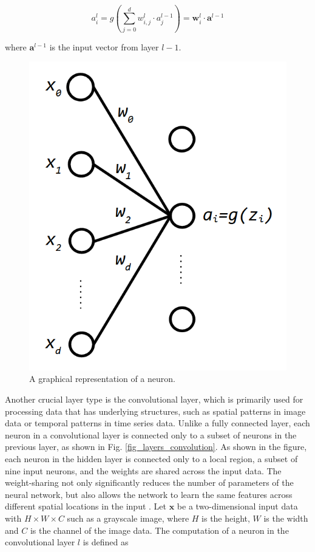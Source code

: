 \documentclass[preprint,12pt]{elsarticle}
\begin{document}
\begin{equation}
a_i^l=g(\sum_{j=0}^{d} w_{i,j}^{l} \cdot a_{j}^{l-1})=\mathbf{w}^{l}_i \cdot \mathbf{a}^{l-1}
\end{equation}

\noindent where $\mathbf{a}^{l-1}$ is the input vector from layer $l-1$.

\begin{figure}[h!]
\centering
\includegraphics[scale=0.5]{fig_layers_neuron.png}
\caption{A graphical representation of a neuron.}
\label{fig_layers_neuron}
\end{figure}

Another crucial layer type is the convolutional layer, which is primarily used for processing data that has underlying structures, such as spatial patterns in image data or temporal patterns in time series data. Unlike a fully connected layer, each neuron in a convolutional layer is connected only to a subset of neurons in the previous layer, as shown in Fig. \ref{fig_layers_convolution}. As shown in the figure, each neuron in the hidden layer is connected only to a local region, a subset of nine input neurons, and the weights are shared across the input data. The weight-sharing not only significantly reduces the number of parameters of the neural network, but also allows the network to learn the same features across different spatial locations in the input \citep{lecun_deep_2015}. Let $\mathbf{x}$ be a two-dimensional input data with $H \times W \times C$ such as a grayscale image, where $H$ is the height, $W$ is the width and $C$ is the channel of the image data. The computation of a neuron in the convolutional layer $l$ is defined as
\end{document}
